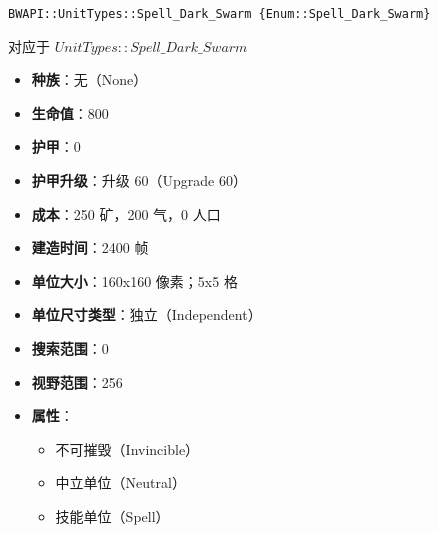 \begin{tcolorbox}[colback=white, colframe=black!60!white, title=Spell\_Dark\_Swarm(), arc=0mm]
    \begin{verbatim}
BWAPI::UnitTypes::Spell_Dark_Swarm {Enum::Spell_Dark_Swarm}
    \end{verbatim}
    对应于  $UnitTypes::Spell\_Dark\_Swarm$ 
    \begin{itemize}
        \item \textbf{种族}：无（None）
        \item \textbf{生命值}：800
        \item \textbf{护甲}：0
        \item \textbf{护甲升级}：升级 60（Upgrade 60）
        \item \textbf{成本}：250 矿，200 气，0 人口
        \item \textbf{建造时间}：2400 帧
        \item \textbf{单位大小}：160x160 像素；5x5 格
        \item \textbf{单位尺寸类型}：独立（Independent）
        \item \textbf{搜索范围}：0
        \item \textbf{视野范围}：256
        \item \textbf{属性}：
            \begin{itemize}
                \item 不可摧毁（Invincible）
                \item 中立单位（Neutral）
                \item 技能单位（Spell）
            \end{itemize}
    \end{itemize}
\end{tcolorbox}

